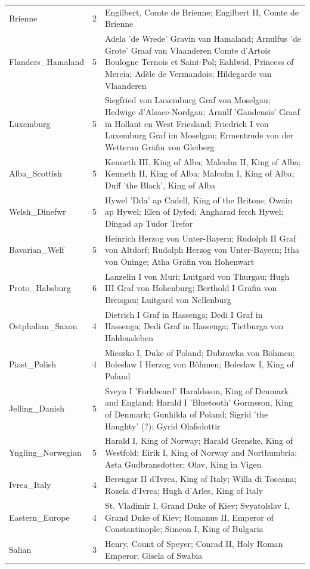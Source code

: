 \documentclass[12pt]{article}
\theoremstyle{definition}
\theoremstyle{remark}
\begin{document}
\begin{longtable}{lrp{9.2cm}}
Brienne & 2 & {\footnotesize Engilbert, Comte de Brienne; Engilbert II, Comte de Brienne} \\
Flanders\_Hamaland & 5 & {\footnotesize Adela 'de Wrede' Gravin van Hamaland; Arnulfus 'de Grote' Graaf van Vlaanderen Comte d'Artois Boulogne Ternois et Saint-Pol; Eahlwid, Princess of Mercia; Adèle de Vermandois; Hildegarde van Vlaanderen} \\
Luxemburg & 5 & {\footnotesize Siegfried von Luxemburg Graf von Moselgau; Hedwige d'Alsace-Nordgau; Arnulf 'Gandensis' Graaf in Hollant en West Friesland; Friedrich I von Luxemburg Graf im Moselgau; Ermentrude von der Wetterau Gräfin von Gleiberg} \\
Alba\_Scottish & 5 & {\footnotesize Kenneth III, King of Alba; Malcolm II, King of Alba; Kenneth II, King of Alba; Malcolm I, King of Alba; Duff 'the Black', King of Alba} \\
Welsh\_Dinefwr & 5 & {\footnotesize Hywel 'Dda' ap Cadell, King of the Britons; Owain ap Hywel; Elen of Dyfed; Angharad ferch Hywel; Dingad ap Tudor Trefor} \\
Bavarian\_Welf & 5 & {\footnotesize Heinrich Herzog von Unter-Bayern; Rudolph II Graf von Altdorf; Rudolph Herzog von Unter-Bayern; Itha von Öninge; Atha Gräfin von Hohenwart} \\
Proto\_Habsburg & 6 & {\footnotesize Lanzelin I von Muri; Luitgard von Thurgau; Hugh III Graf von Hohenburg; Berthold I Gräfin von Breisgau; Luitgard von Nellenburg} \\
Ostphalian\_Saxon & 4 & {\footnotesize Dietrich I Graf in Hassenga; Dedi I Graf in Hassenga; Dedi Graf in Hassenga; Tietburga von Haldensleben} \\
Piast\_Polish & 4 & {\footnotesize Mieszko I, Duke of Poland; Dubrawka von Böhmen; Boleslaw I Herzog von Böhmen; Boleslaw I, King of Poland} \\
Jelling\_Danish & 5 & {\footnotesize Sveyn I 'Forkbeard' Haraldsson, King of Denmark and England; Harald I 'Bluetooth' Gormsson, King of Denmark; Gunhilda of Poland; Sigrid 'the Haughty' (?); Gyrid Olafsdottir} \\
Yngling\_Norwegian & 5 & {\footnotesize Harald I, King of Norway; Harald Grenske, King of Westfold; Eirik I, King of Norway and Northumbria; Asta Gudbransdotter; Olav, King in Vigen} \\
Ivrea\_Italy & 4 & {\footnotesize Berengar II d'Ivrea, King of Italy; Willa di Toscana; Rozela d'Ivrea; Hugh d'Arles, King of Italy} \\
Eastern\_Europe & 4 & {\footnotesize St. Vladimir I, Grand Duke of Kiev; Svyatolslav I, Grand Duke of Kiev; Romanus II, Emperor of Constantinople; Simeon I, King of Bulgaria} \\
Salian & 3 & {\footnotesize Henry, Count of Speyer; Conrad II, Holy Roman Emperor; Gisela of Swabia} \\
\end{longtable}
\end{document}
